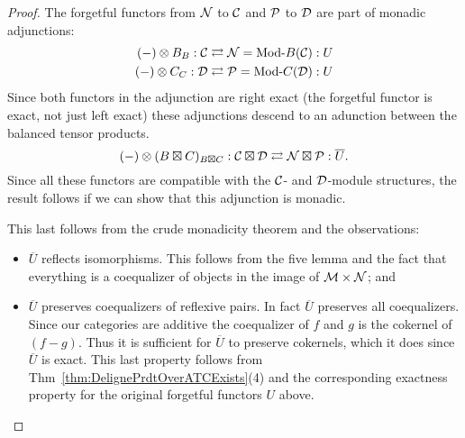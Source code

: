 \documentclass{amsart}
\begin{document}
\begin{proof}
	The forgetful functors from $\mathcal N$ to $\mathcal C$ and $\mathcal P$ to $\mathcal D$ are part of monadic adjunctions:
	\begin{align*}
		(-) \otimes B_{B}:\cC \rightleftarrows \cN = \Mod{}{B}(\cC): U \\
		(-) \otimes C_{C}:\cD \rightleftarrows \cP = \Mod{}{C}(\cD): U
	\end{align*}
	Since both functors in the adjunction are right exact (the forgetful functor is exact, not just left exact) these adjunctions descend to an adunction between the balanced tensor products. 
	\begin{equation*}
		(-) \otimes (B \boxtimes C)_{B \boxtimes C}: \mathcal C \boxtimes \mathcal D \rightleftarrows \mathcal N \boxtimes \mathcal P: \overline{U}.
	\end{equation*}
	Since all these functors are compatible with the $\mathcal C$- and $\mathcal D$-module structures, the result follows if we can show that this adjunction is monadic.
	
	This last follows from the crude monadicity theorem \cite[\S~3.5]{MR771116} and the observations:
	\begin{itemize}
		\item $\overline{U}$ reflects isomorphisms. This follows from the five lemma and the fact that everything is a coequalizer of objects in the image of $\mathcal M \times \mathcal N$; and
		\item $\overline{U}$ preserves coequalizers of reflexive pairs. In fact $\overline{U}$ preserves all coequalizers. Since our categories are additive the coequalizer of $f$ and $g$ is the cokernel of $(f-g)$. Thus it is sufficient for $\overline{U}$ to preserve cokernels, which it does since $\overline{U}$ is exact. This last property follows from  Thm~\ref{thm:DelignePrdtOverATCExists}(4) and the corresponding exactness property for the original forgetful functors $U$ above.
 \qedhere
	\end{itemize}
\end{proof}





\end{document}
